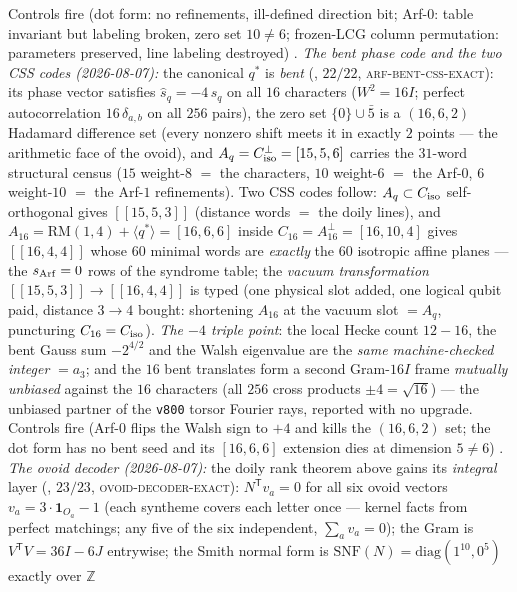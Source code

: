 \documentclass[11pt,a4paper]{article}
\newcommand{\Z}{\mathbb{Z}}
\theoremstyle{definition}
\begin{document}
\begin{keybox}
Controls fire (dot form: no refinements, ill-defined direction
bit; Arf-$0$: table invariant but labeling broken, zero set $10
\ne 6$; frozen-LCG column permutation: parameters preserved,
line labeling destroyed) \mE.
\emph{The bent phase code and the two CSS codes (2026-08-07):}
the canonical $q^{*}$ is \emph{bent}
(, $22/22$,
\textsc{arf-bent-css-exact}): its phase vector satisfies
$\hat s_q = -4\, s_q$ on all $16$ characters ($W^2 = 16I$;
perfect autocorrelation $16\,\delta_{a,b}$ on all $256$ pairs),
the zero set $\{0\} \cup \bar5$ is a $(16,6,2)$ Hadamard
difference set (every nonzero shift meets it in exactly $2$
points --- the arithmetic face of the ovoid), and $A_q =
C_{\rm iso}^{\perp} = [15,5,6]$ carries the $31$-word structural
census ($15$ weight-$8$ $=$ the characters, $10$ weight-$6$ $=$
the Arf-$0$, $6$ weight-$10$ $=$ the Arf-$1$ refinements).  Two
CSS codes follow: $A_q \subset C_{\rm iso}$ self-orthogonal
gives $[[15,5,3]]$ (distance words $=$ the doily lines), and
$A_{16} = \mathrm{RM}(1,4) + \langle q^{*}\rangle = [16,6,6]$
inside $C_{16} = A_{16}^{\perp} = [16,10,4]$ gives $[[16,4,4]]$
whose $60$ minimal words are \emph{exactly} the $60$ isotropic
affine planes --- the $s_{\rm Arf} = 0$ rows of the syndrome
table; the \emph{vacuum transformation} $[[15,5,3]] \to
[[16,4,4]]$ is typed (one physical slot added, one logical qubit
paid, distance $3 \to 4$ bought: shortening $A_{16}$ at the
vacuum slot $= A_q$, puncturing $C_{16} = C_{\rm iso}$).
\emph{The $-4$ triple point}: the local Hecke count $12 - 16$,
the bent Gauss sum $-2^{4/2}$ and the Walsh eigenvalue are the
\emph{same machine-checked integer} $= a_3$; and the $16$ bent
translates form a second Gram-$16I$ frame \emph{mutually
unbiased} against the $16$ characters (all $256$ cross products
$\pm4 = \sqrt{16}$) --- the unbiased partner of the \texttt{v800}
torsor Fourier rays, reported with no upgrade.  Controls fire
(Arf-$0$ flips the Walsh sign to $+4$ and kills the $(16,6,2)$
set; the dot form has no bent seed and its $[16,6,6]$ extension
dies at dimension $5 \ne 6$) \mE.
\emph{The ovoid decoder (2026-08-07):} the doily rank theorem
above gains its \emph{integral} layer
(, $23/23$,
\textsc{ovoid-decoder-exact}): $N^{\mathsf T}v_a = 0$ for all six
ovoid vectors $v_a = 3\cdot\mathbf 1_{O_a} - 1$ (each syntheme
covers each letter once --- kernel facts from perfect matchings;
any five of the six independent, $\sum_a v_a = 0$); the Gram is
$V^{\mathsf T}V = 36I - 6J$ entrywise; the Smith normal form is
$\mathrm{SNF}(N) = \mathrm{diag}(1^{10}, 0^5)$ exactly over $\Z$

\end{keybox}
\end{document}
